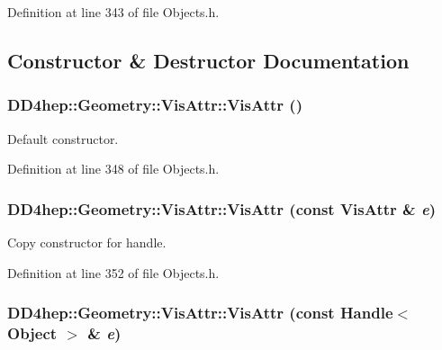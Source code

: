 Definition at line 343 of file Objects.h.

\subsection{Constructor \& Destructor Documentation}
\hypertarget{class_d_d4hep_1_1_geometry_1_1_vis_attr_acfba4fd373c7595e64e5a88069646d09}{
\subsubsection[{VisAttr}]{\setlength{\rightskip}{0pt plus 5cm}DD4hep::Geometry::VisAttr::VisAttr ()}}
\label{class_d_d4hep_1_1_geometry_1_1_vis_attr_acfba4fd373c7595e64e5a88069646d09}


Default constructor. 

Definition at line 348 of file Objects.h.\hypertarget{class_d_d4hep_1_1_geometry_1_1_vis_attr_ab2085f9fc993fb7e83b4ba3430e6216e}{
\subsubsection[{VisAttr}]{\setlength{\rightskip}{0pt plus 5cm}DD4hep::Geometry::VisAttr::VisAttr (const {\bf VisAttr} \& {\em e})}}
\label{class_d_d4hep_1_1_geometry_1_1_vis_attr_ab2085f9fc993fb7e83b4ba3430e6216e}


Copy constructor for handle. 

Definition at line 352 of file Objects.h.\hypertarget{class_d_d4hep_1_1_geometry_1_1_vis_attr_a2e977728c8f627c4b5dea219d2353fda}{
\subsubsection[{VisAttr}]{\setlength{\rightskip}{0pt plus 5cm}DD4hep::Geometry::VisAttr::VisAttr (const {\bf Handle}$<$ {\bf Object} $>$ \& {\em e})}}
\label{class_d_d4hep_1_1_geometry_1_1_vis_attr_a2e977728c8f627c4b5dea219d2353fda}


